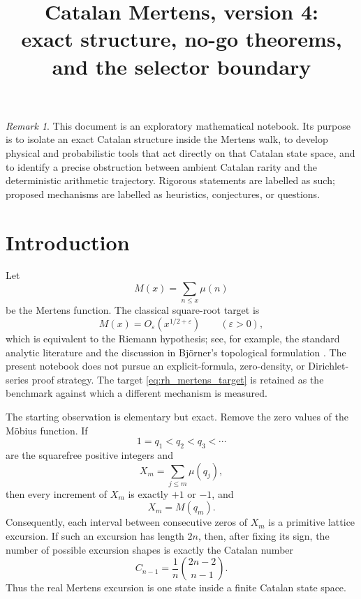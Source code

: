 \documentclass[11pt]{amsart}
\title[Catalan Mertens]{Catalan Mertens, version 4:\\exact structure, no-go theorems, and the selector boundary}
\author{}
\date{}
\numberwithin{equation}{section}
\theoremstyle{plain}
\theoremstyle{definition}
\theoremstyle{remark}
\newtheorem{remark}[theorem]{Remark}
\newcommand{\Mob}{\mu}
\newcommand{\Mert}{M}
\newcommand{\Cat}{C}
\newcommand{\eps}{\varepsilon}
\begin{document}
\maketitle
\tableofcontents
\bigskip

\begin{remark}
\label{rem:exploratory_nature}
This document is an exploratory mathematical notebook.  Its purpose is to isolate an exact Catalan structure inside the Mertens walk, to develop physical and probabilistic tools that act directly on that Catalan state space, and to identify a precise obstruction between ambient Catalan rarity and the deterministic arithmetic trajectory.  Rigorous statements are labelled as such; proposed mechanisms are labelled as heuristics, conjectures, or questions.
\end{remark}

\section{Introduction}
\label{sec:introduction}

Let
\begin{equation}
\Mert(x)=\sum_{n\le x}\Mob(n)
\label{eq:mertens_definition}
\end{equation}
be the Mertens function.  The classical square-root target is
\begin{equation}
\Mert(x)=O_{\eps}\!\left(x^{1/2+\eps}\right)
\qquad (\eps>0),
\label{eq:rh_mertens_target}
\end{equation}
which is equivalent to the Riemann hypothesis; see, for example, the standard analytic literature and the discussion in Bj\"orner's topological formulation \cite{Bjorner2011}.  The present notebook does not pursue an explicit-formula, zero-density, or Dirichlet-series proof strategy.  The target \eqref{eq:rh_mertens_target} is retained as the benchmark against which a different mechanism is measured.

The starting observation is elementary but exact.  Remove the zero values of the M\"obius function.  If
\begin{equation}
1=q_1<q_2<q_3<\cdots
\label{eq:squarefree_enumeration}
\end{equation}
are the squarefree positive integers and
\begin{equation}
X_m=\sum_{j\le m}\Mob(q_j),
\label{eq:compressed_walk}
\end{equation}
then every increment of $X_m$ is exactly $+1$ or $-1$, and
\begin{equation}
X_m=\Mert(q_m).
\label{eq:compressed_equals_mertens}
\end{equation}
Consequently, each interval between consecutive zeros of $X_m$ is a primitive lattice excursion.  If such an excursion has length $2n$, then, after fixing its sign, the number of possible excursion shapes is exactly the Catalan number
\begin{equation}
\Cat_{n-1}=\frac{1}{n}\binom{2n-2}{n-1}.
\label{eq:primitive_catalan_count_intro}
\end{equation}
Thus the real Mertens excursion is one state inside a finite Catalan state space.
\end{document}
